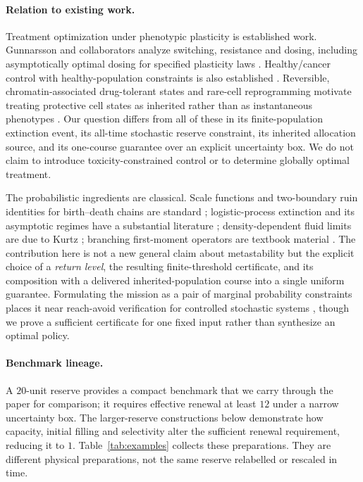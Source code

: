 \documentclass[11pt]{article}
\theoremstyle{remark}\newtheorem{remark}[theorem]{Remark}
\newcommand{\1}{\mathbf 1}
\begin{document}
\paragraph{Relation to existing work.}
Treatment optimization under phenotypic plasticity is established work. Gunnarsson and collaborators analyze switching, resistance and dosing, including asymptotically optimal dosing for specified plasticity laws \citep{gunnarsson2020,gunnarsson2025}. Healthy/cancer control with healthy-population constraints is also established \citep{pouchol}. Reversible, chromatin-associated drug-tolerant states and rare-cell reprogramming motivate treating protective cell states as inherited rather than as instantaneous phenotypes \citep{sharma2010,shaffer2017}. Our question differs from all of these in its finite-population extinction event, its all-time stochastic reserve constraint, its inherited allocation source, and its one-course guarantee over an explicit uncertainty box. We do not claim to introduce toxicity-constrained control or to determine globally optimal treatment.

The probabilistic ingredients are classical. Scale functions and two-boundary ruin identities for birth--death chains are standard \citep{karlin1975}; logistic-process extinction and its asymptotic regimes have a substantial literature \citep{foxall}; density-dependent fluid limits are due to Kurtz \citep{kurtz1970,ethierkurtz}; branching first-moment operators are textbook material \citep{athreyaney}. The contribution here is not a new general claim about metastability but the explicit choice of a \emph{return level}, the resulting finite-threshold certificate, and its composition with a delivered inherited-population course into a single uniform guarantee. Formulating the mission as a pair of marginal probability constraints places it near reach-avoid verification for controlled stochastic systems \citep{abate2008,summers2010}, though we prove a sufficient certificate for one fixed input rather than synthesize an optimal policy.

\paragraph{Benchmark lineage.}
A $20$-unit reserve provides a compact benchmark that we carry through the paper for comparison; it requires effective renewal at least $12$ under a narrow uncertainty box. The larger-reserve constructions below demonstrate how capacity, initial filling and selectivity alter the sufficient renewal requirement, reducing it to $1$. Table~\ref{tab:examples} collects these preparations. They are different physical preparations, not the same reserve relabelled or rescaled in time.
\end{document}
